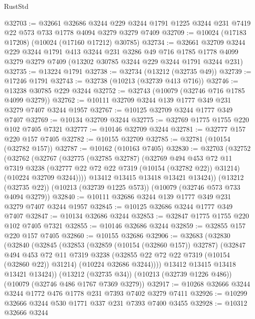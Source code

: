 \begin{lexlean}{RustStd}
\begin{coremodule}
@32703 := @32661
    @32686
    @3244
    @229
    @3244
    @1791
    @1225
    @3244
    @231
    @7419
    @22
    @573
    @733
    @1778
    @4094
    @3279
    @3279
    @7409
@32709 := @10024 (@17183 @17208) (@10024 (@17160 @17212) @30785)
@32734 := @32661
    @32709
    @3244
    @229
    @3244
    @1791
    @413
    @3244
    @231
    @3286
    @49
    @716
    @1785
    @1778
    @4099
    @3279
    @3279
    @7409
    (@13202 @30785 @3244 @229 @3244 @1791 @3244 @231)
@32735 := @13224 @1791
@32738 := @32734 (@13212 (@32735 @49))
@32739 := @17246 @1791
@32743 := @32738 (@10213 (@32739 @413 @716))
@32746 := @13238 @30785 @229 @3244
@32752 := @32743 (@10079 (@32746 @716 @1785 @4099 @3279))
@32762 := @10111 @32709 @3244 @139 @1777 @349 @231 @3279 @7407 @3244 @1957
@32767 := @10125 @32709 @3244 @1777 @349 @7407
@32769 := @10134 @32709 @3244
@32775 := @32769 @1775 @1755 @220 @102 @7405 @7321
@32777 := @10146 @32709 @3244
@32781 := @32777 @157 @220 @157 @7405
@32782 := @10155 @32709
@32785 := @32781 (@10154 (@32782 @157))
@32787 := @10162 (@10163 @7405)
@32830 := @32703
    (@32752
      (@32762
        (@32767
          (@32775
            (@32785 @32787)
            (@32769
              @494
              @453
              @72
              @11
              @7319
              @3238
              (@32777 @22 @72 @22 @7319 (@10154 (@32782 @22)) @31214)
              (@10224 @32709 @3244))))
        @13412
        @13415
        @13418
        @13421
        @13424))
    (@13212 (@32735 @22))
    (@10213 (@32739 @1225 @573))
    (@10079 (@32746 @573 @733 @4094 @3279))
@32840 := @10111 @32686 @3244 @139 @1777 @349 @231 @3279 @7407 @3244 @1957
@32845 := @10125 @32686 @3244 @1777 @349 @7407
@32847 := @10134 @32686 @3244
@32853 := @32847 @1775 @1755 @220 @102 @7405 @7321
@32855 := @10146 @32686 @3244
@32859 := @32855 @157 @220 @157 @7405
@32860 := @10155 @32686
@32906 := @32683
    (@32830
      (@32840
        (@32845
          (@32853
            (@32859 (@10154 (@32860 @157)) @32787)
            (@32847
              @494
              @453
              @72
              @11
              @7319
              @3238
              (@32855 @22 @72 @22 @7319 (@10154 (@32860 @22)) @31214)
              (@10224 @32686 @3244))))
        @13412
        @13415
        @13418
        @13421
        @13424))
    (@13212 (@32735 @34))
    (@10213 (@32739 @1226 @486))
    (@10079 (@32746 @486 @1767 @7369 @3279))
@32917 := @10268 @32666 @3244 @3244 @1772 @476 @1778 @231 @7393 @7402 @3279 @7411
@32926 := @10299 @32666 @3244 @530 @1771 @337 @231 @7393 @7400 @3455
@32928 := @10312 @32666 @3244

\end{coremodule}
\end{lexlean}
